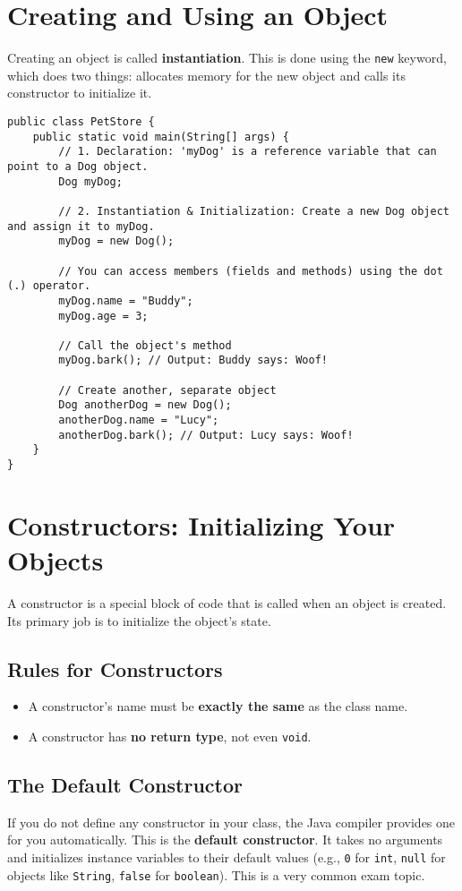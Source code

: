 \documentclass[12pt]{article}
\begin{document}
\begin{enumerate}[label=(\arabic*)]
\section{Creating and Using an Object}
Creating an object is called \textbf{instantiation}. This is done using the \texttt{new} keyword, which does two things: allocates memory for the new object and calls its constructor to initialize it.

\begin{verbatim}
public class PetStore {
    public static void main(String[] args) {
        // 1. Declaration: 'myDog' is a reference variable that can point to a Dog object.
        Dog myDog;

        // 2. Instantiation & Initialization: Create a new Dog object and assign it to myDog.
        myDog = new Dog();

        // You can access members (fields and methods) using the dot (.) operator.
        myDog.name = "Buddy";
        myDog.age = 3;

        // Call the object's method
        myDog.bark(); // Output: Buddy says: Woof!

        // Create another, separate object
        Dog anotherDog = new Dog();
        anotherDog.name = "Lucy";
        anotherDog.bark(); // Output: Lucy says: Woof!
    }
}
\end{verbatim}

\section{Constructors: Initializing Your Objects}
A constructor is a special block of code that is called when an object is created. Its primary job is to initialize the object's state.

\subsection*{Rules for Constructors}
\begin{itemize}
    \item A constructor's name must be \textbf{exactly the same} as the class name.
    \item A constructor has \textbf{no return type}, not even \texttt{void}.
\end{itemize}

\subsection*{The Default Constructor}
If you do not define any constructor in your class, the Java compiler provides one for you automatically. This is the \textbf{default constructor}. It takes no arguments and initializes instance variables to their default values (e.g., \texttt{0} for \texttt{int}, \texttt{null} for objects like \texttt{String}, \texttt{false} for \texttt{boolean}). This is a very common exam topic.


\end{enumerate}
\end{document}
